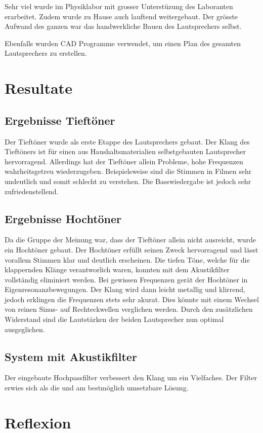 \documentclass[a4paper,11pt]{report}
\begin{document}
Sehr viel wurde im Physiklabor mit grosser Unterstüzung des Laboranten erarbeitet. Zudem wurde zu Hause auch lauftend weitergebaut. Der grösste Aufwand des ganzen war das handwerkliche Bauen des Lautsprechers selbst.

Ebenfalls wurden CAD Programme verwendet, um einen Plan des gesamten Lautsprechers zu erstellen.

\chapter{Resultate}

\section{Ergebnisse Tieftöner}
Der Tieftöner wurde als erste Etappe des Lautsprechers gebaut. Der Klang des Tieftöners ist für einen aus Haushaltsmaterialien selbstgebauten Lautsprecher hervorragend. Allerdings hat der Tieftöner allein Probleme, hohe Frequenzen wahrheitsgetreu wiederzugeben. Beispielsweise sind die Stimmen in Filmen sehr undeutlich und somit schlecht zu verstehen. Die Basswiedergabe ist jedoch sehr zufriedenstellend.

\section{Ergebnisse Hochtöner}
Da die Gruppe der Meinung war, dass der Tieftöner allein nicht ausreicht, wurde ein Hochtöner gebaut. Der Hochtöner erfüllt seinen Zweck hervorragend und lässt vorallem Stimmen klar und deutlich erscheinen. Die tiefen Töne, welche für die klappernden Klänge verantworlich waren, konnten mit dem Akustikfilter vollständig eliminiert werden. Bei gewissen Frequenzen gerät der Hochtöner in Eigenresonanzbewegungen. Der Klang wird dann leicht metallig und klirrend, jedoch erklingen die Frequenzen stets sehr akurat. Dies könnte mit einem Wechsel von reinen Sinus- auf Rechteckwellen verglichen werden. Durch den zusätzlichen Widerstand sind die Lautstärken der beiden Lautsprecher nun optimal ausgeglichen.

\section{System mit Akustikfilter}
Der eingebaute Hochpassfilter verbessert den Klang um ein Vielfaches. Der Filter erwies sich als die und am bestmöglich umsetzbare Lösung.
\chapter{Reflexion}
\end{document}
